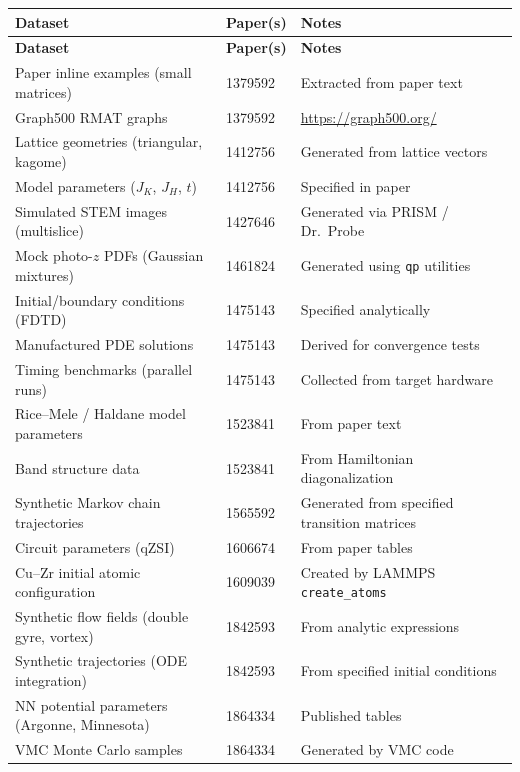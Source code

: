 \documentclass[11pt,a4paper]{article}
\begin{document}
\begin{longtable}{p{5cm} p{3cm} p{6cm}}
\toprule
\textbf{Dataset} & \textbf{Paper(s)} & \textbf{Notes} \\
\midrule
\endfirsthead
\toprule
\textbf{Dataset} & \textbf{Paper(s)} & \textbf{Notes} \\
\midrule
\endhead
Paper inline examples (small matrices) & 1379592 & Extracted from paper text \\
\midrule
Graph500 RMAT graphs & 1379592 & \url{https://graph500.org/} \\
\midrule
Lattice geometries (triangular, kagome) & 1412756 & Generated from lattice vectors \\
\midrule
Model parameters ($J_K$, $J_H$, $t$) & 1412756 & Specified in paper \\
\midrule
Simulated STEM images (multislice) & 1427646 & Generated via PRISM / Dr.\ Probe \\
\midrule
Mock photo-$z$ PDFs (Gaussian mixtures) & 1461824 & Generated using \texttt{qp} utilities \\
\midrule
Initial/boundary conditions (FDTD) & 1475143 & Specified analytically \\
\midrule
Manufactured PDE solutions & 1475143 & Derived for convergence tests \\
\midrule
Timing benchmarks (parallel runs) & 1475143 & Collected from target hardware \\
\midrule
Rice--Mele / Haldane model parameters & 1523841 & From paper text \\
\midrule
Band structure data & 1523841 & From Hamiltonian diagonalization \\
\midrule
Synthetic Markov chain trajectories & 1565592 & Generated from specified transition matrices \\
\midrule
Circuit parameters (qZSI) & 1606674 & From paper tables \\
\midrule
Cu--Zr initial atomic configuration & 1609039 & Created by LAMMPS \texttt{create\_atoms} \\
\midrule
Synthetic flow fields (double gyre, vortex) & 1842593 & From analytic expressions \\
\midrule
Synthetic trajectories (ODE integration) & 1842593 & From specified initial conditions \\
\midrule
NN potential parameters (Argonne, Minnesota) & 1864334 & Published tables \\
\midrule
VMC Monte Carlo samples & 1864334 & Generated by VMC code \\

\end{longtable}
\end{document}
